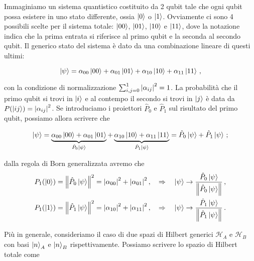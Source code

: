 \begin{esempio}
    Immaginiamo un sistema quantistico costituito da 2 qubit tale che ogni qubit possa esistere in uno stato differente, ossia $\ket{0}$ o $\ket{1}$. Ovviamente ci sono 4 possibili scelte per il sistema totale: $\ket{00}$, $\ket{01}$, $\ket{10}$ e $\ket{11}$, dove la notazione indica che la prima entrata si riferisce al primo qubit e la seconda al secondo qubit. Il generico stato del sistema è dato da una combinazione lineare di questi ultimi:
    
    \begin{equation*}
        \ket{\psi} = \alpha_{00} \ket{00} + \alpha_{01} \ket{01} + \alpha_{10} \ket{10} + \alpha_{11} \ket{11} \, ,
    \end{equation*}
    
    \noindent con la condizione di normalizzazione $\sum_{i,j=0}^1 \abs{\alpha_{ij}}^2 = 1$. La probabilità che il primo qubit si trovi in $\ket{i}$ e al contempo il secondo si trovi in $\ket{j}$ è data da $P(\ket{ij}) = \abs{\alpha_{ij}}^2$. Se introduciamo i proiettori $\hat{P}_0$ e $\hat{P}_1$ sul risultato del primo qubit, possiamo allora scrivere che
    
    \begin{equation*}
        \ket{\psi} = \underbrace{\alpha_{00} \ket{00} + \alpha_{01} \ket{01}}_{\hat{P}_0 \ket{\psi}} + \underbrace{\alpha_{10} \ket{10} + \alpha_{11} \ket{11}}_{\hat{P}_1 \ket{\psi}} = \hat{P}_0 \ket{\psi} + \hat{P}_1 \ket{\psi} \, ;
    \end{equation*}
    
        \noindent dalla regola di Born generalizzata avremo che
        \begin{align*}
            P_1(\ket{0}) &= \norm{\hat{P}_0 \ket{\psi}}^2 = \abs{\alpha_{00}}^2 + \abs{\alpha_{01}}^2 \, , \quad \Rightarrow \quad \ket{\psi} \rightarrow \frac{\hat{P}_0 \ket{\psi}}{\norm{\hat{P}_0 \ket{\psi}}} \, , \\
            P_1(\ket{1}) &= \norm{\hat{P}_1 \ket{\psi}}^2 = \abs{\alpha_{10}}^2 + \abs{\alpha_{11}}^2 \, , \quad \Rightarrow \quad \ket{\psi} \rightarrow \frac{\hat{P}_1 \ket{\psi}}{\norm{\hat{P}_1 \ket{\psi}}} \, .
        \end{align*}
\end{esempio}

\noindent Più in generale, consideriamo il caso di due spazi di Hilbert generici $\mathcal{H}_A$ e $\mathcal{H}_B$ con basi $\ket{n}_A$ e $\ket{n}_B$ rispettivamente. Possiamo scrivere lo spazio di Hilbert totale come 

